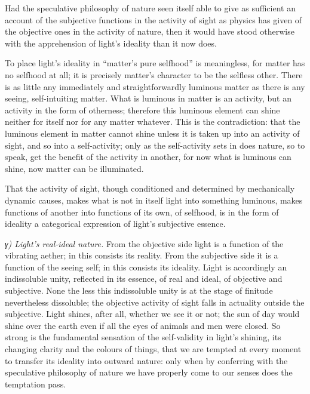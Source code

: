 \documentclass[12pt,a4paper]{book}
\newcommand{\subrunin}[1]{\emph{#1}\hspace{0.4em}}
\begin{document}
Had the speculative philosophy of nature seen itself able to give as sufficient an account of the subjective functions
in the activity of sight as physics has given of the objective ones in the activity of nature, then it would have stood
otherwise with the apprehension of light's ideality than it now does.

To place light's ideality in ``matter's pure selfhood'' is meaningless, for matter has no selfhood at all; it is
precisely matter's character to be the selfless other. There is as little any immediately and straightforwardly luminous
matter as there is any seeing, self-intuiting matter. What is luminous in matter is an activity, but an activity in the
form of otherness; therefore this luminous element can shine neither for itself nor for any matter whatever. This is the
contradiction: that the luminous element in matter cannot shine unless it is taken up into an activity of sight, and so
into a self-activity; only as the self-activity sets in does nature, so to speak, get the benefit of the activity in
another, for now what is luminous can shine, now matter can be illuminated.

That the activity of sight, though conditioned and determined by mechanically dynamic causes, makes what is not in
itself light into something luminous, makes functions of another into functions of its own, of selfhood, is in the form
of ideality a categorical expression of light's subjective essence.

\subrunin{γ) Light's real-ideal nature.} From the objective side light is a function of the vibrating aether; in this
consists its reality. From the subjective side it is a function of the seeing self; in this consists its ideality. Light
is accordingly an indissoluble unity, reflected in its essence, of real and ideal, of objective and subjective. None the
less
this indissoluble unity is at the stage of finitude nevertheless dissoluble; the objective activity of sight falls in
actuality outside the subjective. Light shines, after all, whether we see it or not; the sun of day would shine over the
earth even if all the eyes of animals and men were closed. So strong is the fundamental sensation of the self-validity
in light's shining, its changing clarity and the colours of things, that we are tempted at every moment to transfer its
ideality into outward nature: only when by conferring with the speculative philosophy of nature we have properly come to
our senses does the temptation pass.
\end{document}
